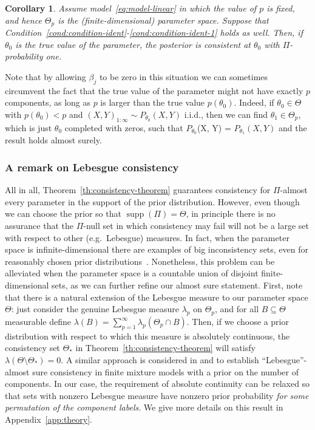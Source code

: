 \documentclass{article}
\numberwithin{equation}{section}
\theoremstyle{plain}
\newtheorem{corollary}[theorem]{Corollary}
\theoremstyle{definition}
\DeclareMathOperator{\supp} {supp}
\begin{document}
\begin{corollary}
  Assume model~\eqref{eq:model-linear} in which the value of \(p\) is fixed, and hence \(\Theta_p\) is the (finite-dimensional) parameter space. Suppose that Condition~\ref{cond:condition-ident}-\ref{cond:condition-ident-1} holds as well. Then, if \(\theta_0\) is the true value of the parameter, the posterior is consistent at \(\theta_0\) with \(\Pi\)-probability one.
\end{corollary}

Note that by allowing \(\beta_j\) to be zero in this situation we can sometimes circumvent the fact that the true value of the parameter might not have exactly \(p\) components, as long as \(p\) is larger than the true value \(p(\theta_0)\). Indeed, if \(\theta_0\in\Theta\) with \(p(\theta_0) < p\) and \((X,Y)_{1:\infty} \sim P_{\theta_0}(X,Y)\) i.i.d., then we can find \(\theta_1\in\Theta_p\), which is just \(\theta_0\) completed with zeros, such that \(P_{\theta_0}\)(X, Y) = \(P_{\theta_1}(X,Y)\) and the result holds almost surely.

\subsubsection*{A remark on Lebesgue consistency}

All in all, Theorem~\ref{th:consistency-theorem} guarantees consistency for \(\Pi\)-almost every parameter in the support of the prior distribution. However, even though we can choose the prior so that \(\supp( \Pi) = \Theta\), in principle there is no assurance that the \(\Pi\)-null set in which consistency may fail will not be a large set with respect to other (e.g.\ Lebesgue) measures. In fact, when the parameter space is infinite-dimensional there are examples of big inconsistency sets, even for reasonably chosen prior distributions~\citep{diaconis1986consistency}. Nonetheless, this problem can be alleviated when the parameter space is a countable union of disjoint finite-dimensional sets, as we can further refine our almost sure statement. First, note that there is a natural extension of the Lebesgue measure to our parameter space \(\Theta\): just consider the genuine Lebesgue measure \(\lambda_p\) on \(\Theta_p\), and for all \(B\subseteq \Theta\) measurable define \(\lambda(B) = \sum_{p=1}^\infty \lambda_p(\Theta_p \cap B)\). Then, if we choose a prior distribution with respect to which this measure is absolutely continuous, the consistency set \(\Theta_*\) in Theorem~\ref{th:consistency-theorem} will satisfy \(\lambda(\Theta \setminus \Theta_*)=0\). A similar approach is considered in \citet{nobile1994bayesian} and \citet{miller2023consistency} to establish ``Lebesgue''-almost sure consistency in finite mixture models with a prior on the number of components. In our case, the requirement of absolute continuity can be relaxed so that sets with nonzero Lebesgue measure have nonzero prior probability \textit{for some permutation of the component labels}. We give more details on this result in Appendix~\ref{app:theory}.
\end{document}
